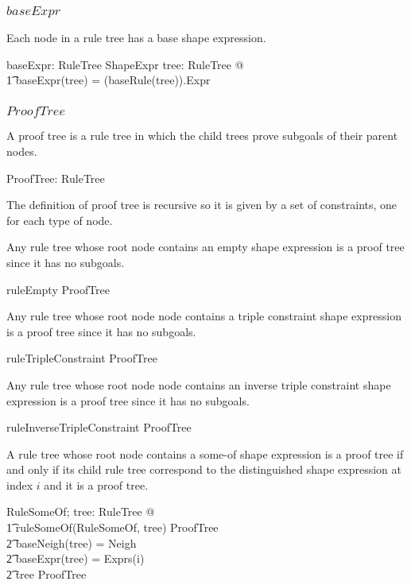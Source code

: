 \documentclass{article}
\begin{document}
\subsubsection{$baseExpr$}
Each node in a rule tree has a base shape expression.
\begin{axdef}
	baseExpr: RuleTree \fun ShapeExpr
\where
	\forall tree: RuleTree @ \\
\t1		baseExpr(tree) = (baseRule(tree)).Expr
\end{axdef}

\subsubsection{$ProofTree$}
A proof tree is a rule tree in which the child trees prove subgoals of their parent nodes.
\begin{axdef}
	ProofTree: \power RuleTree
\end{axdef}

The definition of proof tree is recursive so it is given by a set of constraints, one for each type of node.

Any rule tree whose root node contains an empty shape expression is a proof tree
since it has no subgoals.
\begin{zed}
	\ran ruleEmpty \subset ProofTree
\end{zed}

Any rule tree whose root node node contains a triple constraint shape expression is a proof tree
since it has no subgoals.
\begin{zed}
	\ran ruleTripleConstraint \subset ProofTree
\end{zed}

Any rule tree whose root node node contains an inverse triple constraint shape expression is a proof tree
since it has no subgoals.
\begin{zed}
	\ran ruleInverseTripleConstraint \subset ProofTree
\end{zed}

A rule tree whose root node contains a some-of shape expression is a proof tree if and only if
its child rule tree correspond to the distinguished shape expression at index $i$ and it is a proof tree.
\begin{zed}
	\forall RuleSomeOf; tree: RuleTree @ \\
\t1		ruleSomeOf(\theta RuleSomeOf, tree) \in ProofTree \iff \\
\t2			baseNeigh(tree) = Neigh \land \\
\t2			baseExpr(tree) = Exprs(i) \land \\
\t2			tree \in ProofTree
\end{zed}
\end{document}
